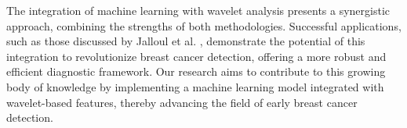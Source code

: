 The integration of machine learning with wavelet analysis presents a synergistic approach, combining the strengths of both methodologies. Successful applications, such as those discussed by Jalloul et al. \cite{Ovarian}, demonstrate the potential of this integration to revolutionize breast cancer detection, offering a more robust and efficient diagnostic framework. Our research aims to contribute to this growing body of knowledge by implementing a machine learning model integrated with wavelet-based features, thereby advancing the field of early breast cancer detection.